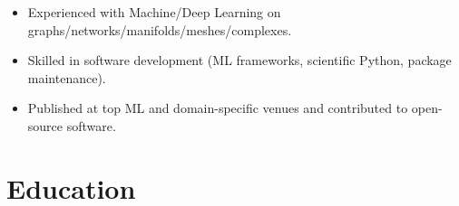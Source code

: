 \documentclass[11pt,a4paper,sans]{moderncv}
\begin{document}
\begin{itemize}  %
    \item Experienced with Machine/Deep Learning on graphs/networks/manifolds/meshes/complexes.
    \item Skilled in software development (ML frameworks, scientific Python, package maintenance).
    \item Published at top ML and domain-specific venues and contributed to open-source software.
\end{itemize}


\section{Education}
\end{document}
